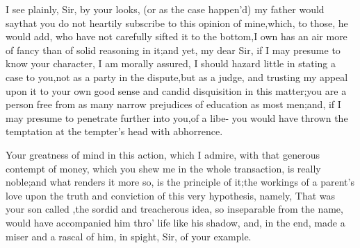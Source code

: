 \documentclass[twoside]{article}
\begin{document}
I see plainly, Sir, by your looks, (or as the case happen’d) my
father would say\tsk that you do not heartily subscribe to this
opinion of mine,\tsk which, to those, he would add, who have not
carefully sifted it to the bottom,\tsk I own has an air more of
fancy than of solid reasoning in it;\tsh and yet, my dear
Sir, if I may presume to know your character, I am morally assured,
I should hazard little in stating a case to you,\tsk not as a party in
the dispute,\tsk but as a judge, and trusting my appeal upon it
to your own good sense and candid disquisition in this
matter;\tsh you are a person free from as many narrow
prejudices of education as most men;\tsk and, if I may presume to
penetrate further into you,\tsk of a libe-
you
would have thrown the temptation at the tempter’s head with
abhorrence.

Your greatness of mind in this action, which I admire, with that
generous contempt of money, which you shew me in the whole
transaction, is really noble;\tsk\break and what renders it more so, is
the principle of it;\tsk the workings of a parent’s\break
love upon the truth and conviction of\break
this very hypothesis, namely, That
was your son called ,\tsk the sordid and
treacherous idea, so inseparable from the name, would have
accompanied him\break
thro’ life like his shadow, and, in the\break
end, made a miser and a rascal of him,\break 
in spight, Sir, of your example.
\end{document}
